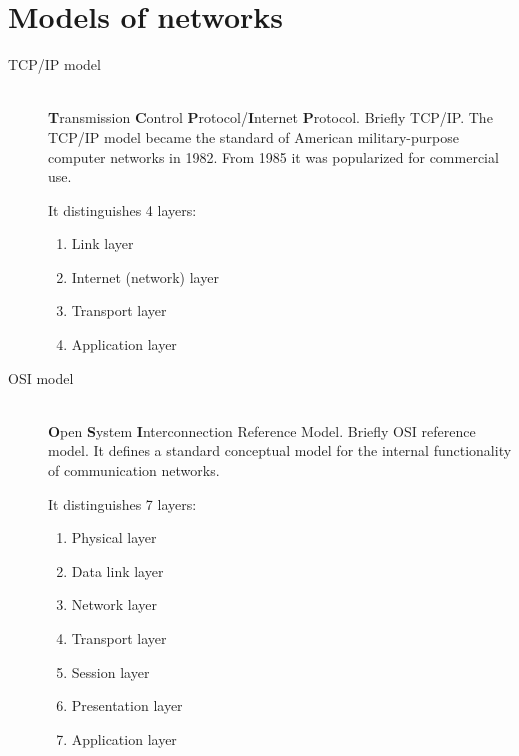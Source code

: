\documentclass[margin=0px]{article}
\begin{document}
\section{Models of networks}
\begin{description}
    \item[TCP/IP model]  \hfill \\
        \textbf{T}ransmission \textbf{C}ontrol \textbf{P}rotocol/\textbf{I}nternet \textbf{P}rotocol. Briefly TCP/IP. The TCP/IP model became the standard of American military-purpose computer networks in 1982. From 1985 it was popularized for commercial use.

        It distinguishes 4 layers:
        \begin{enumerate}
            \item Link layer
            \item Internet (network) layer
            \item Transport layer
            \item Application layer
        \end{enumerate}
    \item[OSI model]  \hfill \\
        \textbf{O}pen \textbf{S}ystem \textbf{I}nterconnection Reference Model. Briefly OSI reference model. It defines a standard conceptual model for the internal functionality of communication networks.

        It distinguishes 7 layers:
        \begin{enumerate}
            \item Physical layer
            \item Data link layer
            \item Network layer
            \item Transport layer
            \item Session layer
            \item Presentation layer
            \item Application layer
        \end{enumerate}
\end{description}
\end{document}
